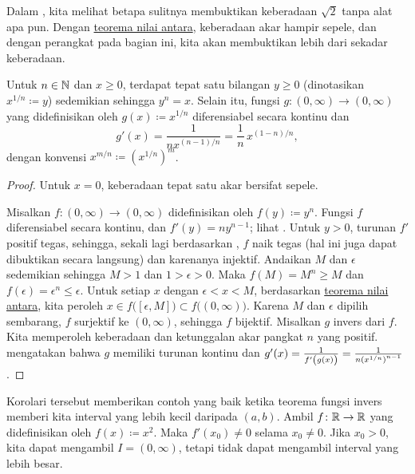 Dalam , kita melihat betapa sulitnya
membuktikan keberadaan $\sqrt{2}$ tanpa alat apa pun.
Dengan \hyperref[IVT:thm]{teorema nilai antara},
keberadaan akar hampir sepele, dan
dengan perangkat pada bagian ini, kita akan membuktikan
lebih dari sekadar keberadaan.

\begin{cor}
Untuk $n \in {\mathbb{N}}$ dan $x \geq 0$, terdapat tepat satu
bilangan $y \geq 0$ (dinotasikan $x^{1/n} \coloneqq y$) sedemikian sehingga $y^n = x$.  Selain itu,
fungsi $g \colon (0,\infty) \to (0,\infty)$ yang didefinisikan oleh
$g(x) \coloneqq x^{1/n}$ diferensiabel secara kontinu dan
\begin{equation*}
g'(x) = \frac{1}{nx^{(n-1)/n}} = \frac{1}{n} \, x^{(1-n)/n} ,
\end{equation*}
dengan konvensi $x^{m/n} \coloneqq {(x^{1/n})}^{m}$.
\end{cor}

\begin{proof}
Untuk $x=0$, keberadaan tepat satu akar bersifat sepele.

Misalkan $f \colon (0,\infty) \to (0,\infty)$ didefinisikan oleh $f(y) \coloneqq y^n$.
Fungsi $f$ diferensiabel secara kontinu,
dan $f'(y) = ny^{n-1}$; lihat .
Untuk $y > 0$, turunan $f'$ positif tegas,
sehingga, sekali lagi berdasarkan , $f$ naik
tegas (hal ini juga dapat dibuktikan secara langsung) dan karenanya injektif.
Andaikan $M$ dan $\epsilon$ sedemikian sehingga
$M > 1$ dan $1 > \epsilon > 0$.
Maka
$f(M) = M^n \geq M$ dan
$f(\epsilon) = \epsilon^n \leq \epsilon$.
Untuk setiap $x$ dengan $\epsilon < x < M$,
berdasarkan
\hyperref[IVT:thm]{teorema nilai antara}, kita peroleh $x \in
f\bigl( [\epsilon,M] \bigr) \subset
f\bigl( (0,\infty) \bigr)$.  Karena $M$ dan $\epsilon$ dipilih sembarang, $f$ surjektif ke
$(0,\infty)$, sehingga $f$ bijektif.
Misalkan $g$ invers dari $f$.  Kita memperoleh
keberadaan dan ketunggalan akar pangkat
$n$ yang positif.   mengatakan bahwa $g$ memiliki turunan
kontinu dan $g'(x) =
\frac{1}{f'\left(\vphantom{1^1_1}g(x)\right)} = \frac{1}{n {(x^{1/n})}^{n-1}}$.
\end{proof}

\begin{example}
Korolari tersebut memberikan contoh yang baik ketika teorema fungsi invers
memberi kita interval yang lebih kecil daripada $(a,b)$.  Ambil $f \colon {\mathbb{R}} \to {\mathbb{R}}$
yang didefinisikan oleh $f(x) \coloneqq x^2$.  Maka $f'(x_0) \neq 0$
selama $x_0 \neq 0$.  Jika $x_0 > 0$, kita dapat mengambil $I=(0,\infty)$, tetapi
tidak dapat mengambil interval yang lebih besar.
\end{example}

